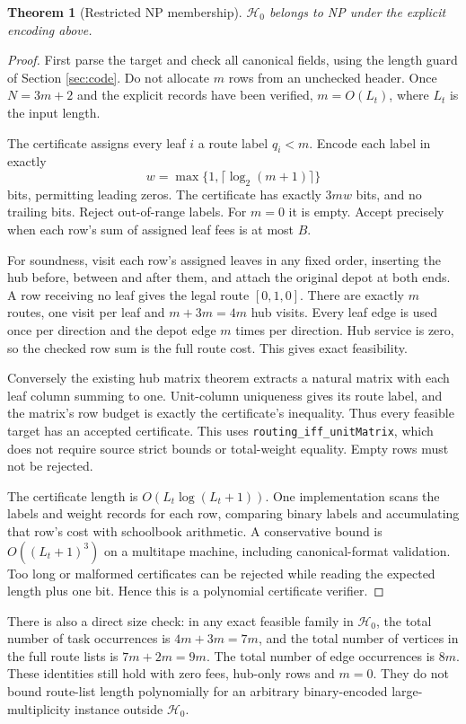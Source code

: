\documentclass[11pt]{article}
\newtheorem{theorem}[definition]{Theorem}
\theoremstyle{remark}
\newcommand{\code}[1]{\nolinkurl{#1}}
\newcommand{\Hstar}{\mathcal H_0}
\begin{document}
\begin{theorem}[Restricted NP membership]\label{thm:np}
$\Hstar$ belongs to NP under the explicit encoding above.
\end{theorem}
\begin{proof}
First parse the target and check all canonical fields, using the length
guard of Section \ref{sec:code}. Do not allocate $m$ rows from an unchecked
header. Once $N=3m+2$ and the explicit records have been verified, $m=O(L_t)$,
where $L_t$ is the input length.

The certificate assigns every leaf $i$ a route label $q_i<m$. Encode each
label in exactly
\[
 w=\max\{1,\lceil\log_2(m+1)\rceil\}
\]
bits, permitting leading zeros. The certificate has exactly $3mw$ bits,
and no trailing bits. Reject out-of-range labels. For $m=0$ it is empty.
Accept precisely when each row's sum of assigned leaf fees is at most $B$.

For soundness, visit each row's assigned leaves in any fixed order, inserting
the hub before, between and after them, and attach the original depot at
both ends. A row receiving no leaf gives the legal route $[0,1,0]$.
There are exactly $m$ routes, one visit per leaf and $m+3m=4m$ hub visits.
Every leaf edge is used once per direction and the depot edge $m$ times
per direction. Hub service is zero, so the checked row sum is the full
route cost. This gives exact feasibility.

Conversely the existing hub matrix theorem extracts a natural matrix with
each leaf column summing to one. Unit-column uniqueness gives its route
label, and the matrix's row budget is exactly the certificate's inequality.
Thus every feasible target has an accepted certificate. This uses
\code{routing_iff_unitMatrix}, which does not require source strict bounds
or total-weight equality. Empty rows must not be rejected.

The certificate length is $O(L_t\log(L_t+1))$. One implementation scans
the labels and weight records for each row, comparing binary labels and
accumulating that row's cost with schoolbook arithmetic. A conservative
bound is $O((L_t+1)^3)$ on a multitape machine, including canonical-format
validation. Too long or malformed certificates can be rejected while
reading the expected length plus one bit. Hence this is a polynomial
certificate verifier.
\end{proof}

There is also a direct size check: in any exact feasible family in $\Hstar$,
the total number of task occurrences is $4m+3m=7m$, and the total number of
vertices in the full route lists is $7m+2m=9m$. The total number of edge
occurrences is $8m$. These identities still hold with zero fees, hub-only
rows and $m=0$. They do not bound route-list length polynomially for an
arbitrary binary-encoded large-multiplicity instance outside $\Hstar$.
\end{document}
